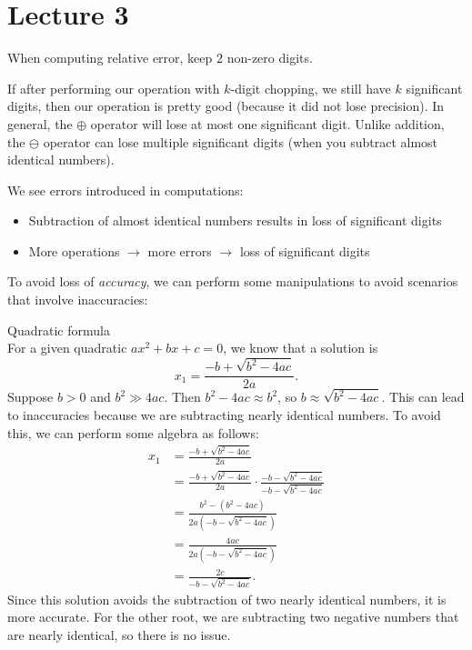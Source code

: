 \documentclass[class=article, crop=false]{standalone}
\begin{document}
  \section{Lecture 3}
  \begin{note}{}
    When computing relative error, keep $2$ non-zero digits.
  \end{note}
  If after performing our operation with $k$-digit chopping, we still have $k$ significant digits, then our operation is pretty good (because it did not lose precision). In general, the $\oplus$ operator will lose at most one significant digit. Unlike addition, the $\ominus$ operator can lose multiple significant digits (when you subtract almost identical numbers). \par
  We see errors introduced in computations:
  \begin{itemize}
    \item Subtraction of almost identical numbers results in loss of significant digits
    \item More operations $\to$ more errors $\to$ loss of significant digits
  \end{itemize}
  To avoid loss of \emph{accuracy}, we can perform some manipulations to avoid scenarios that involve inaccuracies:
  \begin{example}{Quadratic formula} \\
    For a given quadratic $ax^2 + bx + c = 0$, we know that a solution is
    \[
      x_1 = \frac{-b + \sqrt{b^2 - 4ac}}{2a}.
    \]
    Suppose $b > 0$ and $b^2\gg 4ac$. Then $b^2 - 4ac\approx b^2$, so $b\approx \sqrt{b^2 - 4ac}$. This can lead to inaccuracies because we are subtracting nearly identical numbers. To avoid this, we can perform some algebra as follows:
    \begin{align*}
      x_1 &= \frac{-b + \sqrt{b^2 - 4ac}}{2a} \\
          &= \frac{-b + \sqrt{b^2 - 4ac}}{2a}\cdot \frac{-b-\sqrt{b^2 - 4ac}}{-b-\sqrt{b^2 - 4ac}} \\
          &= \frac{b^2 - (b^2 - 4ac)}{2a(-b - \sqrt{b^2 - 4ac})} \\
          &= \frac{4ac}{2a(-b - \sqrt{b^2 - 4ac})} \\
          &= \frac{2c}{-b - \sqrt{b^2 - 4ac}}.
    \end{align*}
    Since this solution avoids the subtraction of two nearly identical numbers, it is more accurate. For the other root, we are subtracting two negative numbers that are nearly identical, so there is no issue.
  \end{example}
\end{document}
